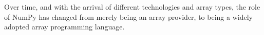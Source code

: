 Over time, and with the arrival of different technologies and array types, the
role of NumPy has changed from merely being an array provider, to being a
widely adopted array programming language.

%
%
%
%
%
